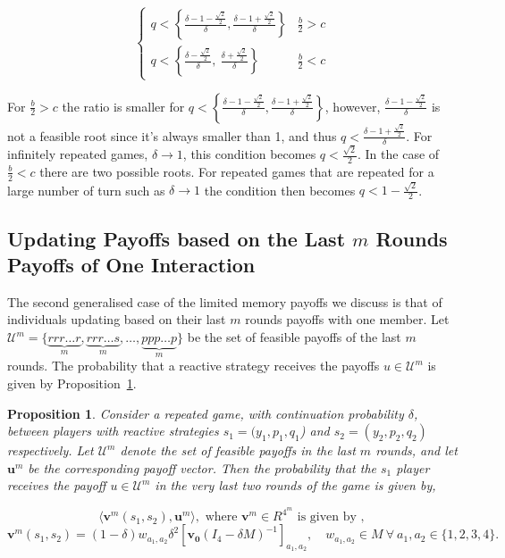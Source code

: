 \documentclass[11pt]{article}
\theoremstyle{plainCl1}
\newtheorem{Prop}{Proposition}
\theoremstyle{plainCl2}
\begin{document}
\begin{equation}
\begin{cases}
  q < \left\{\frac{\delta - 1 - \frac{\sqrt{2}}{2}}{\delta}, \frac{\delta - 1 + \frac{\sqrt{2}}{2}}{\delta}\right\}  & \frac{b}{2} > c \\[0.5cm]
  q < \left\{\frac{\delta - \frac{\sqrt{2}}{2}}{\delta}, \  \frac{\delta + \frac{\sqrt{2}}{2}}{\delta}\right\} & \frac{b}{2} < c
\end{cases}
\end{equation}

For \(\frac{b}{2}>c\) the ratio is smaller for \(q < \left\{\frac{\delta - 1 -
\frac{\sqrt{2}}{2}}{\delta}, \frac{\delta - 1 +
\frac{\sqrt{2}}{2}}{\delta}\right\}\), however, \(\frac{\delta - 1 -
\frac{\sqrt{2}}{2}}{\delta}\) is not a feasible root since it's always smaller
than 1, and thus \(q < \frac{\delta - 1 + \frac{\sqrt{2}}{2}}{\delta}\). For
infinitely repeated games, \(\delta \rightarrow 1\), this condition becomes \(q
< \frac{\sqrt{2}}{2}\). In the case of \(\frac{b}{2}<c\) there are two possible
roots. For repeated games that are repeated for a large number of turn such as
\(\delta \rightarrow 1\) the condition then becomes \(q < 1 -
\frac{\sqrt{2}}{2}\).

\subsection{Updating Payoffs based on the Last $m$ Rounds Payoffs of One Interaction}\label{section:m_two_n_one}

The second generalised case of the limited memory payoffs we discuss is that of
individuals updating based on their last $m$ rounds payoffs with one member. Let
\(\mathcal{U}^{m}= \{\underbrace{rrr\dots r}_{m}, \underbrace{rrr\dots s}_{m},
\dots, \underbrace{ppp\dots p}_{m}\}\) be the set of feasible payoffs of the
last $m$ rounds. The probability that a reactive strategy receives the payoffs
$u\!\in\! \mathcal{U}^{m}$ is given by
Proposition~\ref{proposition:last_m_rounds}.

\begin{Prop}\label{proposition:last_m_rounds} Consider a repeated game, with
  continuation probability $\delta$, between players with reactive strategies
  $s_1\!=\!(y_1, p_1, q_1$) and $s_2\!=\!(y_2,p_2,q_2)$ respectively. Let
  $\mathcal{U}^{m}$ denote the set of feasible payoffs in the last
  \(m\) rounds, and let \(\mathbf{u}^{m}\) be the corresponding payoff vector.
  Then the probability that the $s_1$ player receives the payoff $u\!\in\!
  \mathcal{U}^{m}$ in the very last two rounds of the game is given by,

  \begin{equation}
  \langle\mathbf{v}^{m}(s_1,s_2),\mathbf{u}^{m}\rangle, \text{ where } \mathbf{v}^{m} \in R^{4^{m}} \text{ is given by },
  \end{equation}
  \begin{equation}
    \mathbf{v}^{m}(s_1,s_2) = (1 - \delta) w_{a_1, a_2} \delta^2 \left[\mathbf{v_0}(I_4 - \delta M)^{-1}\right]_{a_1, a_2}, \quad  w_{a_1, a_2} \in M \ \forall \ a_1, a_2 \in \{1, 2, 3, 4\}.
  \end{equation}
\end{Prop}
\end{document}

